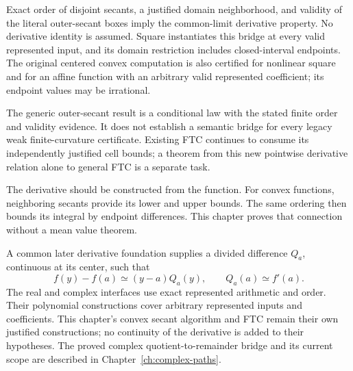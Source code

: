 \begin{theorem}
\label{thm:convex-bracket-derivative-bridge}
\leanok
Exact order of disjoint secants, a justified domain neighborhood, and validity
of the literal outer-secant boxes imply the common-limit derivative property.
No derivative identity is assumed. Square instantiates this bridge at every
valid represented input, and its domain restriction includes closed-interval
endpoints. The original centered convex computation is also certified for
nonlinear square and for an affine function with an arbitrary valid represented
coefficient; its endpoint values may be irrational.
\end{theorem}

The generic outer-secant result is a conditional law with the stated finite
order and validity evidence. It does not establish a semantic bridge for every
legacy weak finite-curvature certificate. Existing FTC continues to consume
its independently justified cell bounds; a theorem from this new pointwise
derivative relation alone to general FTC is a separate task.

\label{ch:effective-calculus}

The derivative should be constructed from the function.  For convex
functions, neighboring secants provide its lower and upper bounds.  The
same ordering then bounds its integral by endpoint differences.  This
chapter proves that connection without a mean value theorem.

A common later derivative foundation supplies a divided difference $Q_a$,
continuous at its center, such that
\[
 f(y)-f(a)\simeq(y-a)Q_a(y),\qquad Q_a(a)\simeq f'(a).
\]
The real and complex interfaces use exact represented arithmetic and order.
Their polynomial constructions cover arbitrary represented inputs and
coefficients. This chapter's convex secant algorithm and FTC remain their
own justified constructions; no continuity of the derivative is added to
their hypotheses. The proved complex quotient-to-remainder bridge and its
current scope are described in Chapter~\ref{ch:complex-paths}.

